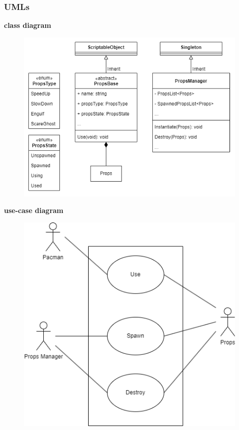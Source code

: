 \documentclass[11pt]{article}
\begin{document}
\subsubsection{UMLs}
\textbf{class diagram}\\
\begin{figure}[H]
    \centering
    \includegraphics*[scale=0.4]{Props-Class.png}
\end{figure}
\textbf{use-case diagram}\\
\begin{figure}[H]
    \centering
    \includegraphics*[scale=0.4]{Props_use-case.png}
\end{figure}
\end{document}
